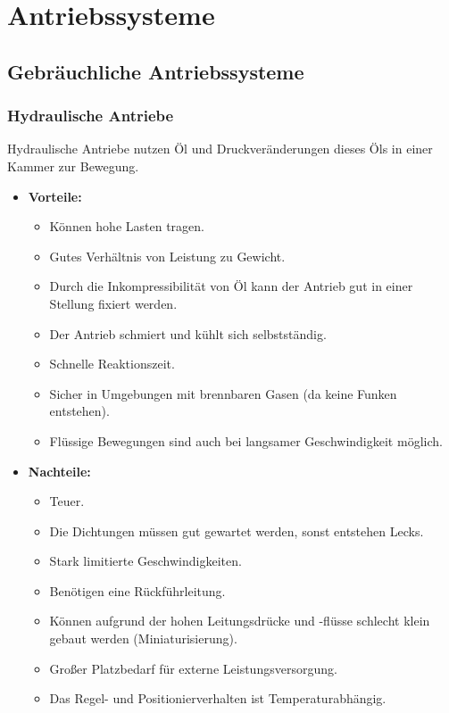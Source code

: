 \chapter{Antriebssysteme}
	\section{Gebräuchliche Antriebssysteme}
		\subsection{Hydraulische Antriebe}
			Hydraulische Antriebe nutzen Öl und Druckveränderungen dieses Öls in einer Kammer zur Bewegung.

			\begin{itemize}
				\item \textbf{Vorteile:}
					\begin{itemize}
						\item Können hohe Lasten tragen.
						\item Gutes Verhältnis von Leistung zu Gewicht.
						\item Durch die Inkompressibilität von Öl kann der Antrieb gut in einer Stellung fixiert werden.
						\item Der Antrieb schmiert und kühlt sich selbstständig.
						\item Schnelle Reaktionszeit.
						\item Sicher in Umgebungen mit brennbaren Gasen (da keine Funken entstehen).
						\item Flüssige Bewegungen sind auch bei langsamer Geschwindigkeit möglich.
					\end{itemize}
				\item \textbf{Nachteile:}
					\begin{itemize}
						\item Teuer.
						\item Die Dichtungen müssen gut gewartet werden, sonst entstehen Lecks.
						\item Stark limitierte Geschwindigkeiten.
						\item Benötigen eine Rückführleitung.
						\item Können aufgrund der hohen Leitungsdrücke und -flüsse schlecht klein gebaut werden (Miniaturisierung).
						\item Großer Platzbedarf für externe Leistungsversorgung.
						\item Das Regel- und Positionierverhalten ist Temperaturabhängig.
					\end{itemize}
			\end{itemize}

